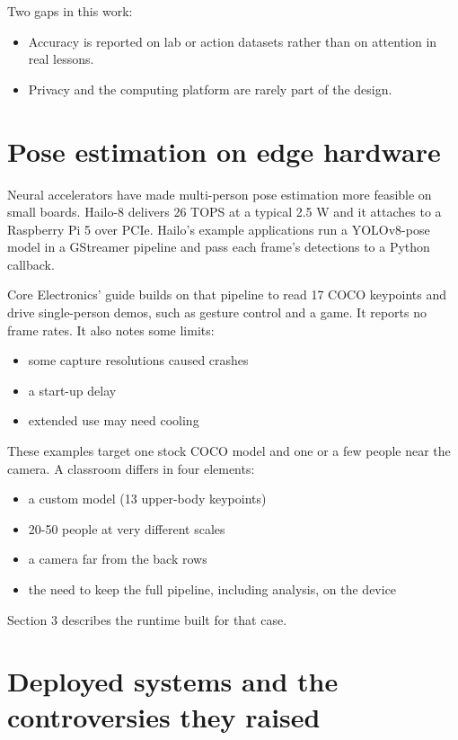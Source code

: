 Two gaps in this work:

\begin{itemize}
\tightlist
\item
  Accuracy is reported on lab or action datasets rather than on attention in real lessons.
\item
  Privacy and the computing platform are rarely part of the design.
\end{itemize}

\section{Pose estimation on edge hardware}

Neural accelerators have made multi-person pose estimation more feasible on small boards. Hailo-8 delivers 26 TOPS at a typical 2.5 W \cite{b5} and it attaches to a Raspberry Pi 5 over PCIe. Hailo's example applications run a YOLOv8-pose model in a GStreamer pipeline and pass each frame's detections to a Python callback.

Core Electronics' guide \cite{b6} builds on that pipeline to read 17 COCO keypoints and drive single-person demos, such as gesture control and a game. It reports no frame rates. It also notes some limits:

\begin{itemize}
\tightlist
\item
  some capture resolutions caused crashes
\item
  a start-up delay
\item
  extended use may need cooling
\end{itemize}

These examples target one stock COCO model and one or a few people near the camera. A classroom differs in four elements:

\begin{itemize}
\tightlist
\item
  a custom model (13 upper-body keypoints)
\item
  20-50 people at very different scales
\item
  a camera far from the back rows
\item
  the need to keep the full pipeline, including analysis, on the device
\end{itemize}

Section 3 describes the runtime built for that case.

\section{Deployed systems and the controversies they raised}

